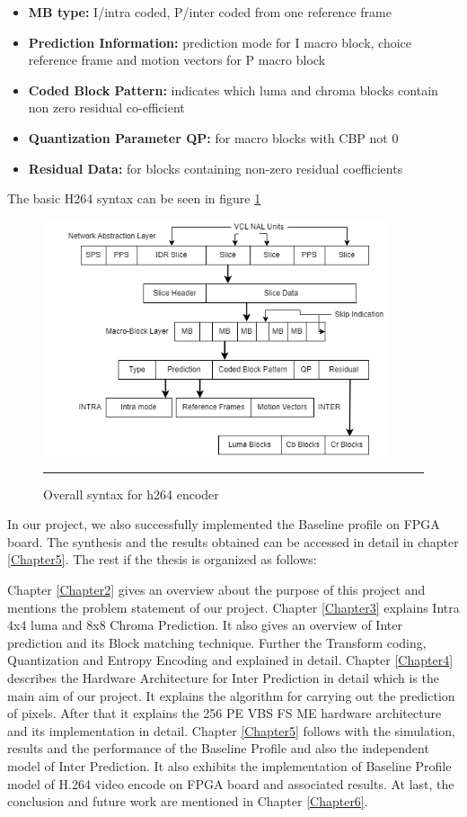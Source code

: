 \begin{itemize}
	\item \textbf{MB type:} I/intra coded, P/inter coded from one reference frame
	\item \textbf{Prediction Information:} prediction mode for I macro block, choice reference frame and motion vectors for P macro block
	\item \textbf{Coded Block Pattern:} indicates which luma and chroma blocks contain non zero residual co-efficient
	\item \textbf{Quantization Parameter QP:} for macro blocks with CBP not 0
	\item \textbf{Residual Data:} for blocks containing non-zero residual coefficients
\end{itemize}

The basic H264 syntax can be seen in figure \ref{fig:syntax}
\begin{figure}[H]
	\centering
	\includegraphics[width = 4in]{./Figures/syntax.png}
	\rule{35em}{0.5pt}
	\caption{Overall syntax for h264 encoder}
	\label{fig:syntax}
\end{figure}

In our project, we also successfully implemented the Baseline profile on FPGA board. The synthesis and the results obtained can be accessed in detail in chapter \ref{Chapter5}. The rest if the thesis is organized as follows:

Chapter \ref{Chapter2} gives an overview about the purpose of this project and mentions the problem statement of our project. Chapter \ref{Chapter3} explains Intra 4x4 luma and 8x8 Chroma Prediction. It also gives an overview of Inter prediction and its Block matching technique. Further the Transform coding, Quantization and Entropy Encoding and explained in detail. Chapter \ref{Chapter4} describes the Hardware Architecture for Inter Prediction in detail which is the main aim of our project. It explains the algorithm for carrying out the prediction of pixels. After that it explains the 256 PE VBS FS ME hardware architecture and its implementation in detail. Chapter \ref{Chapter5} follows with the simulation, results and the performance of the Baseline Profile and also the independent model of Inter Prediction. It also exhibits the implementation of Baseline Profile model of H.264 video encode on FPGA board and associated results. At last, the conclusion and future work are mentioned in Chapter \ref{Chapter6}. 
